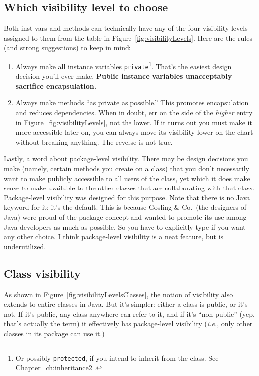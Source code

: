 \subsection{Which visibility level to choose}

Both inst vars and methods can technically have any of the four visibility
levels assigned to them from the table in Figure~\ref{fig:visibilityLevels}.
Here are the rules (and strong suggestions) to keep in mind:

\begin{enumerate}
\itemsep.1em
\item Always make all instance variables \texttt{private}\footnote{Or
possibly \texttt{protected}, if you intend to inherit from the class. See
Chapter~\ref{ch:inheritance2}.}. That's the easiest
design decision you'll ever make. \textbf{Public instance variables
unacceptably sacrifice encapsulation.}
\item Always make methods ``as private as possible.'' This promotes
encapsulation and reduces dependencies. When in doubt, err on the side of the
\textit{higher} entry in Figure~\ref{fig:visibilityLevels}, not the lower. If
it turns out you must make it more accessible later on, you can always move
its visibility lower on the chart without breaking anything. The reverse is
not true.
\end{enumerate}

Lastly, a word about package-level visibility. There may be design decisions
you make (namely, certain methods you create on a class) that you don't
necessarily want to make publicly accessible to all users of the class, yet
which it does make sense to make available to the other classes that are
collaborating with that class. Package-level visibility was designed for this
purpose. Note that there is no Java keyword for it: it's the default. This is
because Gosling \& Co.~(the designers of Java) were proud of the package
concept and wanted to promote its use among Java developers as much as
possible. So you have to explicitly type if you want any other choice. I think
package-level visibility is a neat feature, but is underutilized.

\subsection{Class visibility}

As shown in Figure~\ref{fig:visibilityLevelsClasses}, the notion of visibility
also extends to entire classes in Java. But it's simpler: either a class is
public, or it's not. If it's public, any class anywhere can refer to it, and
if it's ``non-public'' (yep, that's actually the term) it effectively has
package-level visibility (\textit{i.e.}, only other classes in its package can
use it.)

